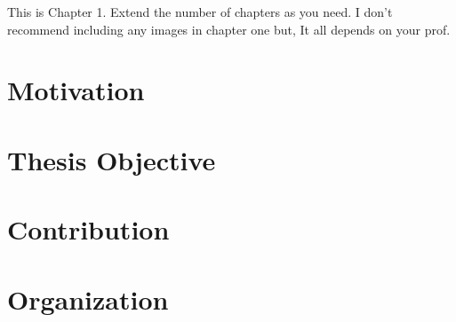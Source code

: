 This is Chapter 1.  Extend the number of chapters as you need.
I don't recommend including any images in chapter one but, It all depends on your prof. 
\section{Motivation}
\section{Thesis Objective}
\section{Contribution}
\section{Organization}
